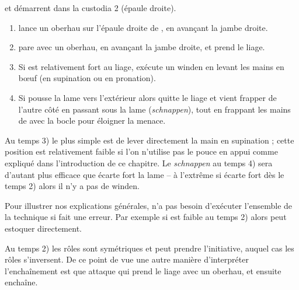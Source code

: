 \begin{technique}[Liegniczer 1]
\label{épée-bocle:tech:liegniczer:1}

\A et \D démarrent dans la custodia 2 (épaule droite).

\begin{enumerate}
	\item \A lance un oberhau sur l'épaule droite de \D, en avançant la jambe droite.
	
	\item \D pare avec un oberhau, en avançant la jambe droite, et prend le liage.
	
	\item {}
		Si \D est relativement fort au liage, \A exécute un winden en levant les mains en bœuf (en supination ou en pronation).
	
	\item {}
		Si \D pousse la lame vers l'extérieur alors \A quitte le liage et vient frapper \D de l'autre côté en passant sous la lame (\emph{schnappen}),
		tout en frappant les mains de \D avec la bocle pour éloigner la menace.
\end{enumerate}

Au temps 3) le plus simple est de lever directement la main en supination ; cette position est relativement faible si l'on n'utilise pas le pouce en appui comme expliqué dans l'introduction de ce chapitre.
Le \emph{schnappen} au temps 4) sera d'autant plus efficace que \D écarte fort la lame – à l'extrême si \D écarte fort dès le temps 2) alors il n'y a pas de winden.

Pour illustrer nos explications générales, \A n'a pas besoin d'exécuter l'ensemble de la technique si \D fait une erreur.
Par exemple si \D est faible au temps 2) alors \A peut estoquer directement.

Au temps 2) les rôles sont symétriques et \D peut prendre l'initiative, auquel cas les rôles s'inversent.
De ce point de vue une autre manière d'interpréter l'enchaînement est que \D attaque \A qui prend le liage avec un oberhau, et ensuite enchaîne.

\end{technique}


